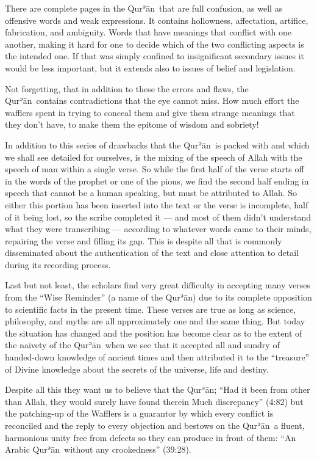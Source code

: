 \documentclass[12pt]{memoir}
\def\´{ʾ} %
\def \Quran{Qur\-\´ān} %
\newcommand{\QRef}[1]{{\color{darkblue}#1}}
\begin{document}
There are complete pages in the \Quran\ that are full confusion,
as well as offensive words and weak expressions.
It contains hollowness, affectation, artifice, fabrication, and ambiguity.
Words that have meanings that conflict with one another,
making it hard for one to decide
which of the two conflicting aspects is the intended one.
If that was simply confined to insignificant secondary issues
it would be less important,
but it extends also to issues of belief and legislation.

Not forgetting, that in addition to these the errors and flaws,
the \Quran\ contains contradictions that the eye cannot miss.
How much effort the wafflers spent in trying to conceal them
and give them strange meanings that they don’t have,
to make them the epitome of wisdom and sobriety!

In addition to this series of drawbacks that the \Quran\ is packed with
and which we shall see detailed for ourselves,
is the mixing of the speech of Allah with
the speech of man within a single verse.
So while the first half of the verse starts off
in the words of the prophet or one of the pious,
we find the second half ending in speech that cannot be a human speaking,
but must be attributed to Allah.
So either this portion has been inserted
into the text or the verse is incomplete,
half of it being lost, so the scribe completed it —
and most of them didn’t understand what they were transcribing —
according to whatever words came to their minds,
repairing the verse and filling its gap.
This is despite all that is commonly disseminated
about the authentication of the text and close attention
to detail during its recording process.

Last but not least, the scholars find very great difficulty in
accepting many verses from the “Wise Reminder” (a name of the \Quran)
due to its complete opposition to scientific facts in the present time.
These verses are true as long as science, philosophy,
and myths are all approximately one and the same thing.
But today the situation has changed and the position has become clear
as to the extent of the naïvety of the \Quran\ when we see
that it accepted all and sundry of handed-down knowledge of ancient times
and then attributed it to the “treasure” of Divine knowledge
about the secrets of the universe, life and destiny.

Despite all this they want us to believe that the \Quran;
“Had it been from other than Allah, they would surely
have found therein Much discrepancy” (\QRef{4:82})
but the patching-up of the Wafflers is a guarantor by which every conflict
is reconciled and the reply to every objection
and bestows on the \Quran\ a fluent,
harmonious unity free from defects so they can produce in front of them:
“An Arabic \Quran\ without any crookedness” (\QRef{39:28}).
\end{document}
